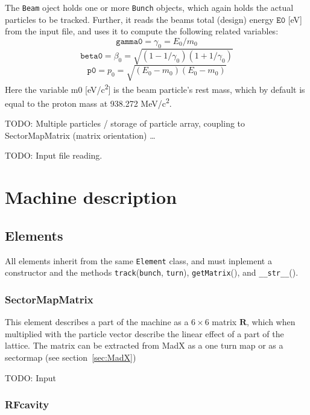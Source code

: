 \documentclass[a4paper]{report}
\begin{document}
The \texttt{Beam} oject holds one or more \texttt{Bunch} objects, which again holds the actual particles to be tracked. Further, it reads the beams total (design) energy $\mathtt{E0}$ [eV] from the input file, and uses it to compute the following related variables:
\begin{equation}
  \mathtt{gamma0} = \gamma_0 = E_0/m_0
\end{equation}
\begin{equation}
  \mathtt{beta0} = \beta_0 = \sqrt{\left(1-1/\gamma_0\right) \left(1+1/\gamma_0\right)}
\end{equation}
\begin{equation}
  \mathtt{p0} = p_0 = \sqrt{\left(E_0-m_0\right) \left(E_0-m_0\right)}
  \label{eq:designmomentum}
\end{equation}
Here the variable m0 [eV/c\textsuperscript{2}] is the beam particle's rest mass, which by default is equal to the proton mass at 938.272 MeV/c\textsuperscript{2}.

TODO: Multiple particles / storage of particle array, coupling to SectorMapMatrix (matrix orientation) \ldots

TODO: Input file reading.

\chapter{Machine description}
\label{sec:machine}



\section{Elements}
All elements inherit from the same \texttt{Element} class, and must inplement a constructor and the methods \texttt{track}(\texttt{bunch}, \texttt{turn}), \texttt{getMatrix}(), and \texttt{\_\_str\_\_}().

\subsection{SectorMapMatrix}
This element describes a part of the machine as a $6 \times 6$ matrix $\mathbf{R}$, which when multiplied with the particle vector describe the linear effect of a part of the lattice.
The matrix can be extracted from MadX as a one turn map or as a sectormap (see section~\ref{sec:MadX})

TODO: Input

\subsection{RFcavity}
\label{sec:elements:RFcavity}
\end{document}
